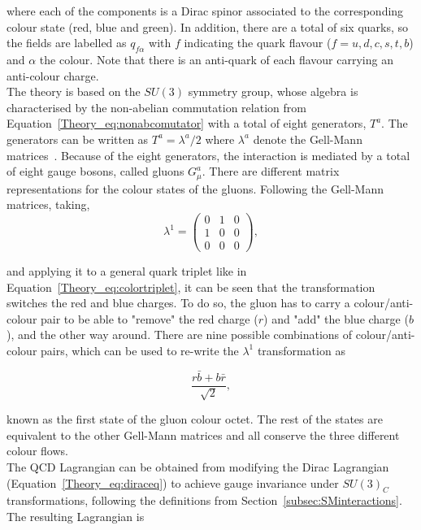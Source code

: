 where each of the components is a Dirac spinor associated to the corresponding colour state (red, blue and green).
In addition, there are a total of six quarks, so the fields are labelled as $q_{f\alpha}$ with $f$ indicating the quark flavour
($f=u,d,c,s,t,b$) and $\alpha$ the colour. Note that there is an anti-quark of each flavour carrying an anti-colour charge.\\

The theory is based on the $SU(3)$ symmetry group, whose algebra is characterised by the non-abelian commutation relation from Equation~\ref{Theory_eq:nonabcomutator} with a total of eight generators, $T^a$. The generators can be written as $T^a=\lambda^a/2$ where $\lambda^a$
denote the Gell-Mann matrices~\cite{GellMann}.
Because of the eight generators, the interaction is mediated by a total of eight gauge bosons, called gluons $G_\mu^a$.
There are different matrix representations for the colour states of the gluons. Following the Gell-Mann matrices, taking,
\begin{equation}
\lambda^1 = \begin{pmatrix} 0 & 1 & 0 \\
1 & 0 & 0 \\
0 & 0 & 0 \end{pmatrix},
\end{equation}

and applying it to a general quark triplet like in Equation~\ref{Theory_eq:colortriplet},
it can be seen that the transformation switches the red and blue charges.
To do so, the gluon has to carry a colour/anti-colour pair to be able to "remove" the red charge ($r$) and "add" the blue charge ($b$),
and the other way around. There are nine possible combinations of colour/anti-colour pairs, which can be used to re-write the $\lambda^1$
transformation as

\begin{equation}
\frac{r\bar{b}+b\bar{r}}{\sqrt{2}},
\end{equation}

known as the first state of the gluon colour octet. The rest of the states are equivalent to the other Gell-Mann matrices and all conserve
the three different colour flows.\\

The QCD Lagrangian can be obtained from modifying the Dirac Lagrangian (Equation~\ref{Theory_eq:diraceq})
to achieve gauge invariance under $SU(3)_C$ transformations, following the definitions from Section~\ref{subsec:SMinteractions}.
The resulting Lagrangian is

